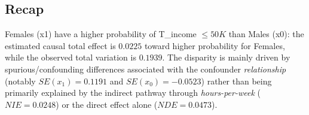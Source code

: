 \documentclass{article}
\begin{document}
\subsection*{Recap}
Females (x1) have a higher probability of T\_income $\leq 50K$ than Males (x0): the estimated causal total effect is $0.0225$ toward higher probability for Females, while the observed total variation is $0.1939$. The disparity is mainly driven by spurious/confounding differences associated with the confounder \emph{relationship} (notably $SE(x_1)=0.1191$ and $SE(x_0)=-0.0523$) rather than being primarily explained by the indirect pathway through \emph{hours-per-week} ($NIE=0.0248$) or the direct effect alone ($NDE=0.0473$).
\end{document}
